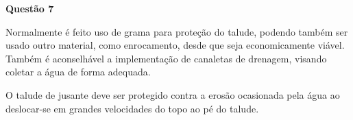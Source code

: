 \item[]\textbf{Questão 7}

\hspace{1cm}Normalmente é feito uso de grama para proteção do talude, podendo também ser usado outro material, como enrocamento, desde que seja economicamente viável. Também é aconselhável a implementação de canaletas de drenagem, visando coletar a água de forma adequada.

\hspace{1cm}O talude de jusante deve ser protegido contra a erosão ocasionada pela água ao deslocar-se em grandes velocidades do topo ao pé do talude.

